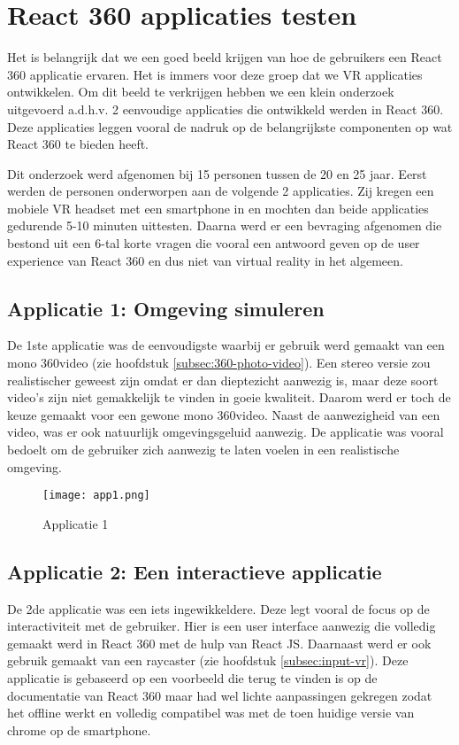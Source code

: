 \chapter{React 360 applicaties testen}
\label{ch:react-360-apps}
Het is belangrijk dat we een goed beeld krijgen van hoe de gebruikers een React 360 applicatie ervaren. Het is immers voor deze groep dat we VR applicaties ontwikkelen. Om dit beeld te verkrijgen hebben we een klein onderzoek uitgevoerd a.d.h.v. 2 eenvoudige applicaties die ontwikkeld werden in React 360. Deze applicaties leggen vooral de nadruk op de belangrijkste componenten op wat React 360 te bieden heeft. 

Dit onderzoek werd afgenomen bij 15 personen tussen de 20 en 25 jaar. Eerst werden de personen onderworpen aan de volgende 2 applicaties. Zij kregen een mobiele VR headset met een smartphone in en mochten dan beide applicaties gedurende 5-10 minuten uittesten. Daarna werd er een bevraging afgenomen die bestond uit een 6-tal korte vragen die vooral een antwoord geven op de user experience van React 360 en dus niet van virtual reality in het algemeen.

\section{Applicatie 1: Omgeving simuleren}
\label{sec:omgeving-simulatie}
De 1ste applicatie was de eenvoudigste waarbij er gebruik werd gemaakt van een mono 360\textdegree video (zie hoofdstuk \ref{subsec:360-photo-video}). Een stereo versie zou realistischer geweest zijn omdat er dan dieptezicht aanwezig is, maar deze soort video's zijn niet gemakkelijk te vinden in goeie kwaliteit. Daarom werd er toch de keuze gemaakt voor een gewone mono 360\textdegree video. Naast de aanwezigheid van een video, was er ook natuurlijk omgevingsgeluid aanwezig. De applicatie was vooral bedoelt om de gebruiker zich aanwezig te laten voelen in een realistische omgeving.

\begin{figure}[H]
	\centering
	\texttt{[image: app1.png]}
	\caption{Applicatie 1}
	\label{fig:app1}
\end{figure}

\section{Applicatie 2: Een interactieve applicatie}
\label{sec:interactieve-applicatie}
De 2de applicatie was een iets ingewikkeldere. Deze legt vooral de focus op de interactiviteit met de gebruiker. Hier is een user interface aanwezig die volledig gemaakt werd in React 360 met de hulp van React JS. Daarnaast werd er ook gebruik gemaakt van een raycaster (zie hoofdstuk \ref{subsec:input-vr}). Deze applicatie is gebaseerd op een voorbeeld die terug te vinden is op de documentatie van React 360 maar had wel lichte aanpassingen gekregen zodat het offline werkt en volledig compatibel was met de toen huidige versie van chrome op de smartphone.

